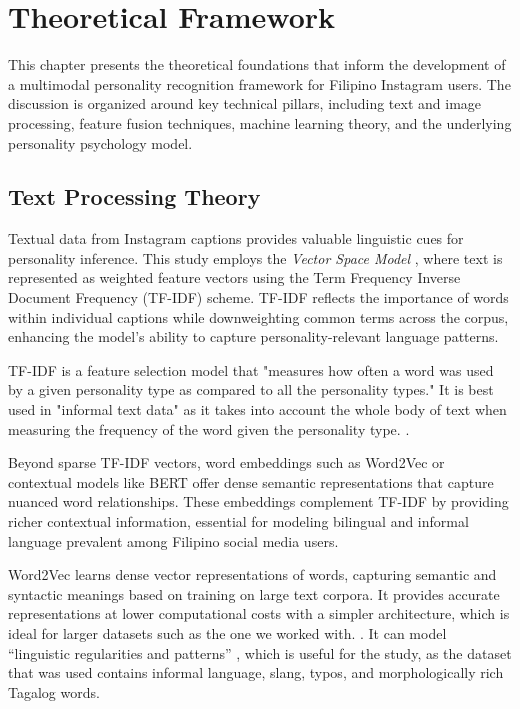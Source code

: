 %
%
%                 

\chapter{Theoretical Framework}
\label{sec:theoframework}

This chapter presents the theoretical foundations that inform the development of a multimodal personality recognition framework for Filipino Instagram users. The discussion is organized around key technical pillars, including text and image processing, feature fusion techniques, machine learning theory, and the underlying personality psychology model.

\section{Text Processing Theory}

Textual data from Instagram captions provides valuable linguistic cues for personality inference. This study employs the \textit{Vector Space Model} \citep{salton1975}, where text is represented as weighted feature vectors using the Term Frequency Inverse Document Frequency (TF-IDF) scheme. TF-IDF reflects the importance of words within individual captions while downweighting common terms across the corpus, enhancing the model's ability to capture personality-relevant language patterns.


TF-IDF is a feature selection model that "measures how often a word was used by a given personality type as compared to all the personality types." It is best used in "informal text data" as it takes into account the whole body of text when measuring the frequency of the word given the personality type. \citep{Pradhan_Bhansali_Chandnani_Pangaonkar_2020}.

Beyond sparse TF-IDF vectors, word embeddings such as Word2Vec or contextual models like BERT offer dense semantic representations that capture nuanced word relationships. These embeddings complement TF-IDF by providing richer contextual information, essential for modeling bilingual and informal language prevalent among Filipino social media users.

Word2Vec learns dense vector representations of words, capturing semantic and syntactic meanings based on training on large text corpora. It provides accurate representations at lower computational costs with a simpler architecture, which is ideal for larger datasets such as the one we worked with.  \citep{Ma_Zhang_2015}. It can model “linguistic regularities and patterns” \citep{Mikolov_Sutskever_Chen_Corrado_Dean_2013}, which is useful for the study, as the dataset that was used contains informal language, slang, typos, and morphologically rich Tagalog words. 


